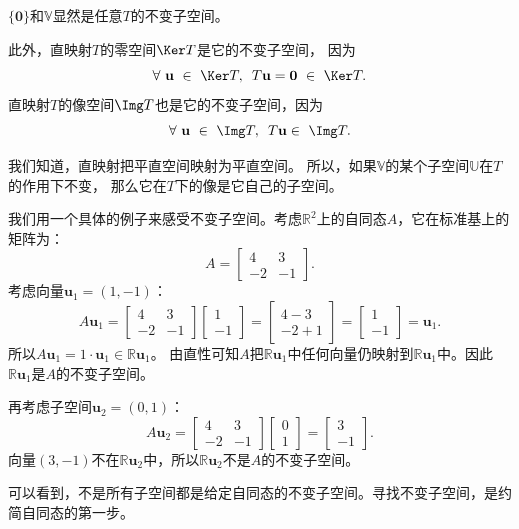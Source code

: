 \documentclass[12pt,UTF8,fontset=none]{ctexbook}
\begin{document}
$\{\mathbf{0}\}$和$\mathbb{V}$显然是任意$T$的不变子空间。

此外，直映射$T$的零空间$\Ker T$是它的不变子空间，
因为
$$\forall \,\, \mathbf{u} \,\, \in \,\, \Ker T, \,\,\, T\mathbf{u} = \mathbf{0} \,\, \in \,\, \Ker T. $$
直映射$T$的像空间$\Img T$也是它的不变子空间，因为
$$\forall \,\, \mathbf{u} \,\, \in \,\, \Img T, \,\,\, T\mathbf{u} \in \,\, \Img T. $$

我们知道，直映射把平直空间映射为平直空间。
所以，如果$\mathbb{V}$的某个子空间$\mathbb{U}$在$T$的作用下不变，
那么它在$T$下的像是它自己的子空间。

我们用一个具体的例子来感受不变子空间。考虑$\mathbb{R}^2$上的自同态$A$，它在标准基上的矩阵为：
$$
A = \begin{bmatrix} 4 & 3 \\ -2 & -1 \end{bmatrix}.
$$
考虑向量$\mathbf{u}_1 = (1,-1)$：
$$
A \mathbf{u}_1 = \begin{bmatrix} 4 & 3 \\ -2 & -1 \end{bmatrix}\begin{bmatrix} 1 \\ -1 \end{bmatrix} = \begin{bmatrix} 4-3 \\ -2+1 \end{bmatrix} = \begin{bmatrix} 1 \\ -1 \end{bmatrix} = \mathbf{u}_1.
$$
所以$A\mathbf{u}_1 = 1\cdot \mathbf{u}_1 \in \mathbb{R}\mathbf{u}_1$。
由直性可知$A$把$\mathbb{R}\mathbf{u}_1$中任何向量仍映射到$\mathbb{R}\mathbf{u}_1$中。因此$\mathbb{R}\mathbf{u}_1$是$A$的不变子空间。

再考虑子空间$\mathbf{u}_2 = (0,1)$：
$$
A \mathbf{u}_2 = \begin{bmatrix} 4 & 3 \\ -2 & -1 \end{bmatrix} \begin{bmatrix} 0 \\ 1 \end{bmatrix} = \begin{bmatrix} 3 \\ -1 \end{bmatrix}.
$$
向量$(3,-1)$不在$\mathbb{R}\mathbf{u}_2$中，所以$\mathbb{R}\mathbf{u}_2$不是$A$的不变子空间。

可以看到，不是所有子空间都是给定自同态的不变子空间。寻找不变子空间，是约简自同态的第一步。
\end{document}
